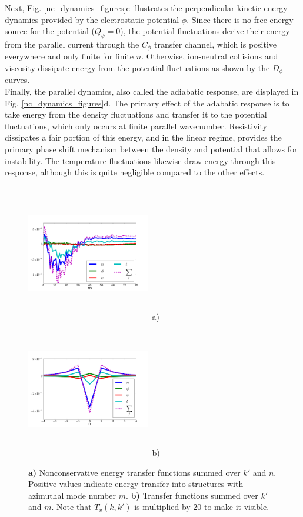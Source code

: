 \documentclass[12pt]{article}
\begin{document}
Next, Fig. \ref{nc_dynamics_figures}c illustrates the perpendicular kinetic energy dynamics provided by the electrostatic potential $\phi$. 
Since there is no free energy source for the potential ($Q_\phi=0$),
the potential fluctuations derive their energy from the parallel current through the $C_\phi$ transfer channel, which is positive everywhere and only finite for finite $n$. Otherwise, ion-neutral
collisions and viscosity dissipate energy from the potential fluctuations as shown by the $D_\phi$ curves. \\

Finally, the parallel dynamics, also called the adiabatic response, are displayed in Fig. \ref{nc_dynamics_figures}d. The primary effect of the adabatic response is to take energy from the density
fluctuations and transfer it to the potential fluctuations, which only occurs at finite parallel wavenumber. Resistivity dissipates a fair portion of this energy, and in the linear regime, provides
the primary phase shift mechanism between the density and potential that allows for instability. The temperature fluctuations likewise draw energy through this response, although this is
quite negligible compared to the other effects. \\


\begin{figure}
\includegraphics[width=0.48\textwidth,height=60mm]{T_m}~a)
\hfil
\includegraphics[width=0.48\textwidth,height=60mm]{T_n}~b)
\hfil
\caption{\textbf{a)} Nonconservative energy transfer functions summed over $k'$ and $n$. Positive values indicate energy transfer into structures with azimuthal mode number $m$.
\textbf{b)} Transfer functions summed over $k'$ and $m$. Note that $T_v(k,k')$ is multiplied by $20$ to make it visible.}
\label{conservative_transfers}
\end{figure}
\end{document}
